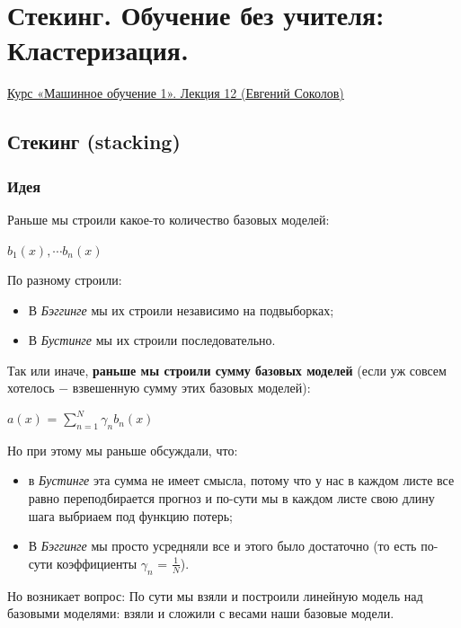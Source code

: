 \newpage
\section{Стекинг. Обучение без учителя: Кластеризация.}
    \href{https://www.youtube.com/watch?v=hCLtjXiBd3A&list=PLEqoHzpnmTfChItexxg2ZfxCsm-8QPsdS&index=14}{Курс «Машинное обучение 1». Лекция 12 (Евгений Соколов)}

    \subsection{Стекинг (stacking)}
        \subsubsection{Идея}
        
        Раньше мы строили какое-то количество базовых моделей:
        \begin{center}
            $b_1(x), \cdots b_n(x)$
        \end{center}
        По разному строили:
        \begin{itemize}
            \item В \textit{Бэггинге} мы их строили независимо на подвыборках;

            \item В \textit{Бустинге} мы их строили последовательно.
        \end{itemize}

        Так или иначе, \textbf{раньше мы строили сумму базовых моделей} (если уж совсем хотелось $-$ взвешенную сумму этих базовых моделей):
        \begin{center}
            $a(x)$ = $\sum\limits_{n = 1}^N\gamma_nb_n(x)$
        \end{center}
        Но при этому мы раньше обсуждали, что:
        \begin{itemize}
            \item в \textit{Бустинге} эта сумма не имеет смысла, потому что у нас в каждом листе все равно переподбирается прогноз и по-сути мы в каждом листе  свою длину шага выбриаем под функцию потерь;

            \item В \textit{Бэггинге} мы просто усредняли все и этого было достаточно (то есть по-сути коэффициенты $\gamma_n$ = $\frac{1}{N}$).
        \end{itemize}

        Но возникает вопрос: По сути мы взяли и построили линейную модель над базовыми моделями: взяли и сложили с весами наши базовые  модели.\\

